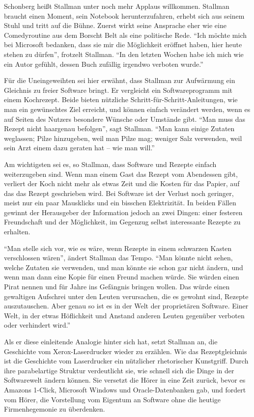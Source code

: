 Schonberg heißt Stallman unter noch mehr Applaus willkommen. Stallman braucht einen Moment, sein Notebook herunterzufahren, erhebt sich aus seinem Stuhl und tritt auf die Bühne. Zuerst wirkt seine Ansprache eher wie eine Comedyroutine aus dem Borscht Belt als eine politische Rede. "`Ich möchte mich bei Microsoft bedanken, dass sie mir die Möglichkeit eröffnet haben, hier heute stehen zu dürfen"', frotzelt Stallman. "`In den letzten Wochen habe ich mich wie ein Autor gefühlt, dessen Buch zufällig irgendwo verboten wurde."'

Für die Uneingeweihten sei hier erwähnt, dass Stallman zur Aufwärmung ein Gleichnis zu freier Software bringt. Er vergleicht ein Softwareprogramm mit einem Kochrezept. Beide bieten nützliche Schritt-für-Schritt-Anleitungen, wie man ein gewünschtes Ziel erreicht, und können einfach verändert werden, wenn es auf Seiten des  Nutzers besondere Wünsche oder Umstände gibt. "`Man muss das Rezept nicht haargenau befolgen"', sagt Stallman. "`Man kann einige Zutaten weglassen; Pilze hinzugeben, weil man Pilze mag; weniger Salz verwenden, weil sein Arzt einem dazu geraten hat – wie man will."'

Am wichtigsten sei es, so  Stallman, dass Software und Rezepte einfach weiterzugeben sind. Wenn man einem Gast das Rezept vom Abendessen gibt, verliert der Koch nicht mehr als etwas Zeit und die Kosten für das Papier, auf das das Rezept geschrieben wird. Bei Software ist der Verlust noch geringer, meist nur ein paar Mausklicks und ein bisschen Elektrizität. In beiden Fällen gewinnt der Herausgeber der Information jedoch an zwei Dingen: einer festeren Freundschaft und der Möglichkeit, im Gegenzug selbst interessante Rezepte zu erhalten.

"`Man stelle sich vor, wie es wäre, wenn Rezepte in einem schwarzen Kasten verschlossen wären"', ändert Stallman das Tempo. "`Man könnte nicht sehen, welche Zutaten sie verwenden, und man könnte sie schon gar nicht ändern, und wenn man dann eine Kopie für einen Freund machen würde. Sie würden einen Pirat nennen und für Jahre ins Gefängnis bringen wollen. Das würde einen gewaltigen Aufschrei unter den Leuten verursachen, die es gewohnt sind, Rezepte auszutauschen. Aber genau so ist es in der Welt der proprietären Software. Einer Welt, in der etwas Höflichkeit und Anstand anderen Leuten gegenüber verboten oder verhindert wird."'

Als er diese einleitende Analogie hinter sich hat, setzt Stallman an, die Geschichte vom Xerox-Laserdrucker wieder zu erzählen. Wie das Rezeptgleichnis ist die Geschichte vom Laserdrucker ein nützlicher rhetorischer Kunstgriff. Durch ihre parabelartige Struktur verdeutlicht sie, wie schnell sich die Dinge in der Softwarewelt ändern können. Sie versetzt die Hörer in eine Zeit zurück, bevor es Amazons 1-Click, Microsoft Windows und Oracle-Datenbanken gab, und fordert vom Hörer, die Vorstellung vom Eigentum an Software ohne die heutige Firmenhegemonie zu überdenken.

